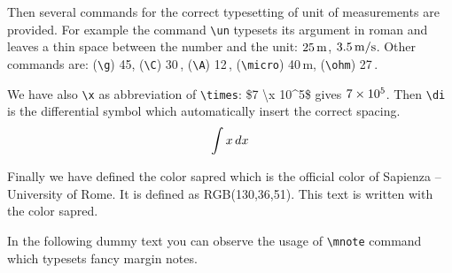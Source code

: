 \documentclass[LaM,binding=0.6cm]{sapthesis}
\newcommand{\bs}{\textbackslash}
\begin{document}
Then several commands for the correct typesetting of unit of measurements are provided. For example the command \texttt{\bs un} typesets its argument in roman and leaves a thin space between the number and the unit: $25\mathrm{\,m}$, $3.5\mathrm{\,m/s}$. Other commands are: (\texttt{\bs g}) 45\g, (\texttt{\bs C}) 30\,\C, (\texttt{\bs A}) 12\,\A, (\texttt{\bs micro}) 40\,\micro m, (\texttt{\bs ohm}) 27\,\ohm. 

We have also \texttt{\bs x} as abbreviation of \texttt{\bs times}: \$7 \bs x 10\^{}5\$ gives $7 \times 10^5$. Then \texttt{\bs di} is the differential symbol which automatically insert the correct spacing.
\[
\int x \mathop{}\!d x
\]

Finally we have defined the color \textsf{sapred} which is the official color
of Sapienza -- University of Rome. It is defined as RGB(130,36,51). \textcolor{sapred}{This text is written with the color \textsf{sapred}.}

In the following dummy text you can observe the usage of \texttt{\bs mnote} command which typesets fancy margin notes.

\textcolor{gray}{\lipsum}
\textcolor{gray}{\lipsum}

\backmatter
\end{document}
